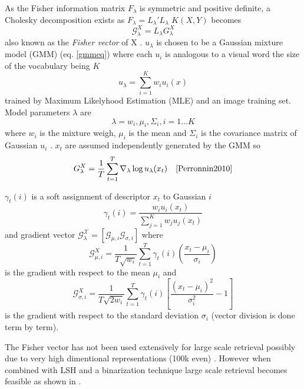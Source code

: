 \documentclass[english,12pt,a4paper,pdftex,elec,utf8]{aaltothesis}
\begin{document}
As the Fisher information matrix $F_\lambda$ is symmetric and positive definite, a Cholesky decomposition exists as $F_\lambda = L_\lambda'L_\lambda$ $K(X,Y)$ becomes
\begin{equation}\label{fishervectorfinal}
\mathcal{G}_\lambda^X = L_\lambda G_\lambda^X
\end{equation}
also known as the \emph{Fisher vector} of X \cite{Perronnin2010}. $u_\lambda$ is chosen to be a Gaussian mixture model (GMM) (eq. \ref{gmmeq}) where each $u_i$ is analogous to a visual word the size of the vocabulary being $K$ \cite{Perronnin2010a}
\begin{equation}\label{gmmeq}
u_\lambda = \sum_{i=1}^K w_iu_i(x)
\end{equation}
trained by Maximum Likelyhood Estimation (MLE) and an image training set. Model parameters $\lambda$ are
\begin{equation}\label{lambdaparams}
\lambda = {w_i,\mu_i, \Sigma_i, i=1 \ldots K}
\end{equation}
where $w_i$ is the mixture weigh, $\mu_i$ is the mean and $\Sigma_i$ is the covariance matrix of Gaussian $u_i$ \cite{Perronnin2010}. $x_t$ are assumed independently generated by the GMM so
\begin{equation}\label{gmm}
G_\lambda^X = \frac{1}{T}\sum_{t=1}^T \nabla_\lambda \log u_\lambda(x_t) \quad \cite{Perronnin2010}
\end{equation}

$\gamma_t(i)$ is a soft assignment of descriptor $x_t$ to Gaussian $i$
\begin{equation} \label{descriptortogaussian}
\gamma_t(i) = \frac{w_iu_i(x_t)}{\sum_{j=1}^Kw_ju_j(x_t)}
\end{equation}
and gradient vector $\mathcal{G_\lambda^X} = [\mathcal{G}_{\mu,i} \mathcal{G}_{\sigma,i}] $ where
\begin{equation}\label{fishervectormu}
\mathcal{G}_{\mu,i}^X = \frac{1}{T\sqrt{w_i}} \sum^T_{t=1} \gamma_t(i)\left(\frac{x_t - \mu_i}{\sigma_i}\right)
\end{equation}
is the gradient with respect to the mean $\mu_i$ and
\begin{equation}\label{fishervectorsigma}
\mathcal{G}_{\sigma,i}^X = \frac{1}{T\sqrt{2w_i}} \sum_{t=1}^T \gamma_t(i)\left[\frac{(x_t - \mu_i)^2}{\sigma_i^2} -1\right]
  \end{equation}
is the gradient with respect to the standard deviation $\sigma_i$ (vector division is done term by term). \cite{Perronnin2010}

The Fisher vector has not been used extensively for large scale retrieval possibly due to very high dimentional representations (100k even) \cite{Perronnin2010a}. However when combined with LSH and a binarization technique large scale retrieval becomes feasible as shown in \cite{Perronnin2010a}.
\end{document}
